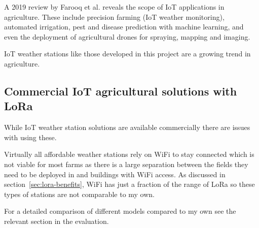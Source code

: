 A 2019 review by Farooq et al. \cite{farooq2019iot} reveals the scope of IoT
applications in agriculture. These include precision farming (IoT weather
monitoring), automated irrigation, pest and disease prediction with machine
learning, and even the deployment of agricultural drones for spraying, mapping
and imaging. 

IoT weather stations like those developed in this project are a growing trend in
agriculture.

\subsection{Commercial IoT agricultural solutions with LoRa}

While IoT weather station solutions are available commercially there are issues
with using these. 

Virtually all affordable weather stations rely on WiFi to stay connected which
is not viable for most farms as there is a large separation between the fields
they need to be deployed in and buildings with WiFi access. As discussed in
section~\ref{sec:lora-benefits}, WiFi has just a fraction of the range of LoRa
so these types of stations are not comparable to my own.

For a detailed comparison of different models compared to my own see the
relevant section in the evaluation.

